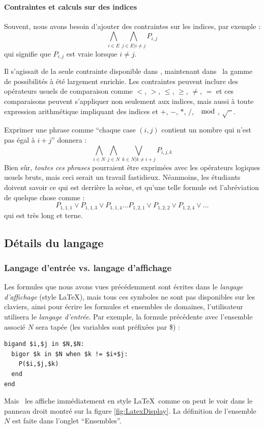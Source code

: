 \paragraph{Contraintes et calculs sur des indices}

Souvent, nous avons besoin d'ajouter des contraintes sur les indices, par exemple :
$$\bigwedge_{i \in E } \bigwedge_{j \in E  | i \neq j}P_{i,j}$$
qui signifie que $P_{i,j}$ est vraie lorsque $i\neq j$. 

Il s'agissait de la seule contrainte disponible dans \satoulouse, maintenant dans \nameTool\ la gamme de possibilités à été largement enrichie. Les contraintes peuvent inclure des opérateurs usuels de comparaison comme $<$, $>$, $\leq$, $\geq$, $\neq$, $=$ et ces comparaisons peuvent s'appliquer non seulement aux indices, mais aussi à toute expression arithmétique impliquant des indices et $+$, $-$, $*$, $/$, $\mod$, $\sqrt{\phantom{x}}$. 

Exprimer une phrase comme ``chaque case $(i,j)$ contient un nombre qui n'est pas égal à $i+j$'' donnera :
$$\bigwedge_{i \in N } \bigwedge_{j \in N} \bigvee_{k \in N|k\neq i+j} P_{i,j,k}$$
Bien s\^ur, \emph{toutes ces phrases} pourraient être exprimées avec les opérateurs logiques usuels bruts, mais ceci serait un travail fastidieux. Néanmoins, les étudiants doivent savoir ce qui est derrière la scène, et qu'une telle formule est l'abréviation de quelque chose comme :
$$P_{1,1,1}\vee P_{1,1,3}\vee P_{1,1,4}\ldots P_{1,2,1}\vee P_{1,2,2}\vee P_{1,2,4}\vee \ldots $$
qui est très long et terne.



\subsection{Détails du langage}

\subsubsection{Langage d'entrée vs. langage d'affichage}

Les formules que nous avons vues précédemment sont écrites dans le \emph{langage d'affichage} (style \LaTeX), mais tous ces symboles ne sont pas disponibles sur les claviers, ainsi pour écrire les formules et ensembles de domaines, l'utilisateur utilisera le \emph{langage d'entrée}.
Par exemple, la formule précédente avec l'ensemble associé $N$ sera tapée (les variables sont pr\'{e}fix\'{e}es par \$) :
\begin{verbatim}
bigand $i,$j in $N,$N:
  bigor $k in $N when $k != $i+$j:
    P($i,$j,$k)
  end
end
\end{verbatim}
Mais \nameTool\ les affiche immédiatement en style \LaTeX\ comme on peut le voir dans le panneau droit montr\'{e} sur la figure \ref{fig:LatexDisplay}.
La d\'{e}finition de l'ensemble $N$ est faite dans l'onglet ``Ensembles''.

